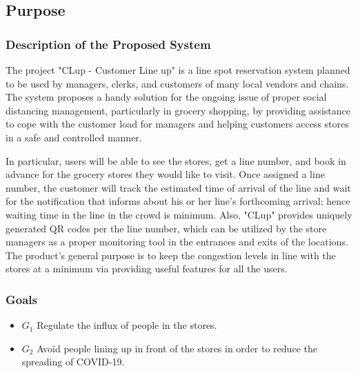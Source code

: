 \subsection{Purpose}

\subsubsection{Description of the Proposed System}
The project "CLup - Customer Line up" is a line spot reservation system planned to be used by managers, clerks, and customers of many local vendors and chains.
The system proposes a handy solution for the ongoing issue of proper social distancing management, particularly in grocery shopping, by providing assistance to cope with the customer load for managers and helping customers access stores in a safe and controlled manner.

In particular, users will be able to see the stores, get a line number, and book in advance for the grocery stores they would like to visit.
Once assigned a line number, the customer will track the estimated time of arrival of the line and wait for the notification that informs about his or her line's forthcoming arrival; hence waiting time in the line in the crowd is minimum.
Also, "CLup" provides uniquely generated QR codes per the line number, which can be utilized by the store managers as a proper monitoring tool in the entrances and exits of the locations.
The product's general purpose is to keep the congestion levels in line with the stores at a minimum via providing useful features for all the users.


\subsubsection{Goals}

\begin{itemize}
    \item \textbf{$G_{1}$} Regulate the influx of people in the stores.
    \item \textbf{$G_{2}$} Avoid people lining up in front of the stores in order to reduce the spreading of COVID-19.
\end{itemize}


